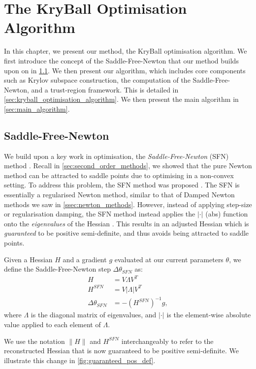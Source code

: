 \chapter{The KryBall Optimisation Algorithm}
\label{chap:method}

In this chapter, we present our method, the KryBall optimisation algorithm. We first introduce the concept of the Saddle-Free-Newton that our method builds upon on in \cref{sec:saddle_free_newton}. We then present our algorithm, which includes core components such as Krylov subspace construction, the computation of the Saddle-Free-Newton, and a trust-region framework. This is detailed in \cref{sec:kryball_optimisation_algorithm}. We then present the main algorithm in \cref{sec:main_algorithm}.

\section{Saddle-Free-Newton}
\label{sec:saddle_free_newton}

We build upon a key work in optimisation, the \textit{Saddle-Free-Newton} (SFN) method \citep{dauphin2014sfn}. Recall in \cref{sec:second_order_methods}, we showed that the pure Newton method can be attracted to saddle points due to optimising in a non-convex setting. To address this problem, the SFN method was proposed \citep{dauphin2014sfn}. The SFN is essentially a regularised Newton method, similar to that of Damped Newton methods we saw in \cref{ssec:newton_methods}. However, instead of applying step-size or regularisation damping, the SFN method instead applies the $|\cdot|$ (abs) function onto the \textit{eigenvalues} of the Hessian \cite{dauphin2014sfn}. This results in an adjusted Hessian which is \textit{guaranteed} to be positive semi-definite, and thus avoids being attracted to saddle points. 

\begin{definition}
    Given a Hessian $H$ and a gradient $g$ evaluated at our current parameters $\theta$, we define the Saddle-Free-Newton step $\Delta \theta_{SFN}$ as:
    \begin{align}
        H &= V \Lambda V^T \\
        H^{SFN} &= V |\Lambda| V^T \\
        \Delta \theta_{SFN} &= -(H^{SFN})^{-1} g,
    \end{align}
    where $\Lambda$ is the diagonal matrix of eigenvalues, and $|\cdot|$ is the element-wise absolute value applied to each element of $\Lambda$.
\end{definition}
We use the notation $\| H \|$ and $H^{SFN}$ interchangeably to refer to the reconstructed Hessian that is now guaranteed to be positive semi-definite. We illustrate this change in \cref{fig:guaranteed_pos_def}.

